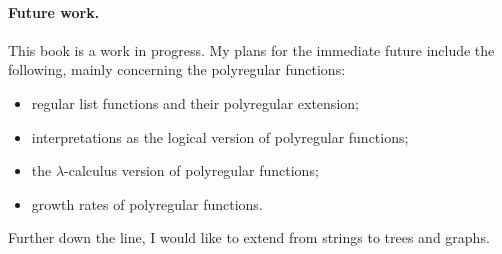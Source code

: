 \paragraph*{Future work.}  This book is a work in progress. My plans for the immediate future include the following, mainly concerning the polyregular functions:
\begin{itemize}
    \item regular list functions and their polyregular extension;
    \item \mso interpretations as the logical version of polyregular functions;
    \item the $\lambda$-calculus version of polyregular functions;
    \item growth rates of polyregular functions.
\end{itemize}
Further down the line, I would like to extend from strings to trees and graphs.